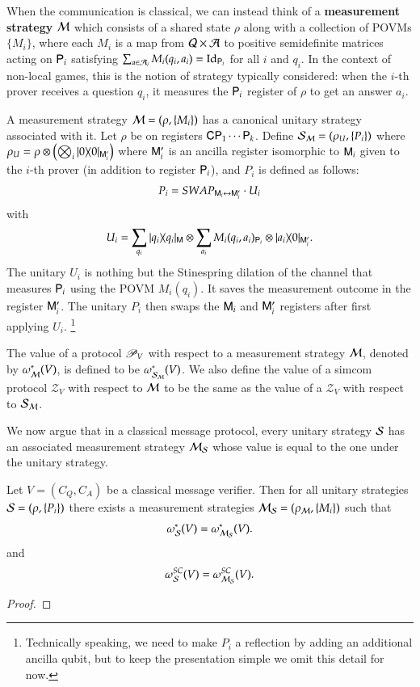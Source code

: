 When the communication is classical, we can instead think of a \textbf{measurement strategy} $\mathcal M$ which consists of a shared state $\rho$ along with a collection of POVMs $\{M_i\}$, where each $M_i$ is a map from $\mathcal Q \times \mathcal A$ to positive semidefinite matrices acting on ${\mathsf{P}}_i$ satisfying $\sum_{a \in \mathcal A_i} M_i(q_i,a_i) = \mathop{\mathrm{Id}}\!\mathinner{}_{{\mathsf{P}}_i}$ for all $i$ and $q_i$. In the context of non-local games, this is the notion of strategy typically considered: when the $i$-th prover receives a question $q_i$, it measures the ${\mathsf{P}}_i$ register of $\rho$ to get an answer $a_i$. 

A measurement strategy $\mathcal M = (\rho,\{M_i\})$ has a canonical unitary strategy associated with it.
Let $\rho$ be on registers ${\mathsf{C}} {\mathsf{P}}_1 \cdots {\mathsf{P}}_k$. Define $\mathcal{S}_\mathcal M = (\rho_U,\{P_i\})$ where $\rho_U = \rho \otimes \left( \bigotimes_i |0\rangle\! \langle 0|_{{\mathsf{M}}_i'}\right)$ where ${\mathsf{M}}_i'$ is an ancilla register isomorphic to ${\mathsf{M}}_i$ given to the $i$-th prover (in addition to register ${\mathsf{P}}_i$), and $P_i$ is defined as follows:
\[
	P_i = SWAP_{{\mathsf{M}}_i \leftrightarrow {\mathsf{M}}_i'} \cdot U_i
\]
with
\[
	U_i = \sum_{q_i} |q_i\rangle\! \langle q_i|_{{\mathsf{M}}} \otimes \sum_{a_i} M_i(q_i,a_i)_{{\mathsf{P}}_i} \otimes |a_i\rangle\! \langle 0|_{{\mathsf{M}}_i'}.
\]
The unitary $U_i$ is nothing but the Stinespring dilation of the channel that measures ${\mathsf{P}}_i$ using the POVM $M_i(q_i)$. It saves the measurement outcome in the register ${\mathsf{M}}_i'$. The unitary $P_i$ then swaps the ${\mathsf{M}}_i$ and ${\mathsf{M}}_i'$ registers after first applying $U_i$. \footnote{Technically speaking, we need to make $P_i$ a reflection by adding an additional ancilla qubit, but to keep the presentation simple we omit this detail for now.} 

The value of a protocol $\mathscr{P}_V$ with respect to a measurement strategy $\mathcal M$, denoted by $\omega^*_{\mathcal M}(V)$, is defined to be $\omega^*_{\mathcal{S}_\mathcal M}(V)$. We also define the value of a simcom protocol $\mathscr{Z}_V$ with respect to $\mathcal M$ to be the same as the value of a $\mathscr{Z}_V$ with respect to $\mathcal{S}_\mathcal M$. 

We now argue that in a classical message protocol, every unitary strategy $\mathcal{S}$ has an associated measurement strategy $\mathcal M_{\mathcal{S}}$ whose value is equal to the one under the unitary strategy.

\begin{lemma}
\label{lem:unitary_measurement_strat}
Let $V = (C_Q,C_A)$ be a classical message verifier. Then for all unitary strategies $\mathcal{S} = (\rho,\{ P_i \})$ there exists a measurement strategies $\mathcal M_{\mathcal{S}} = (\rho_\mathcal M,\{M_i\})$ such that
	\[
		\omega^*_{\mathcal{S}}(V) = \omega^*_{\mathcal M_{\mathcal{S}}}(V).
	\]
	and
	\[
		\omega^{SC}_{\mathcal{S}}(V) = \omega^{SC}_{\mathcal M_{\mathcal{S}}}(V).
	\]	
\end{lemma}
\begin{proof}
\end{proof}

